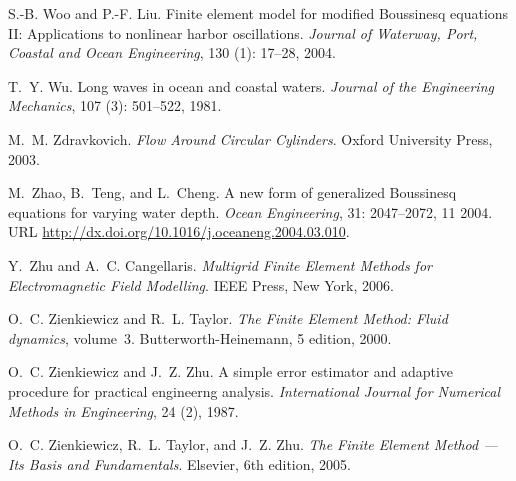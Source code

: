 \begin{thebibliography}{467}
S.-B. Woo and P.-F. Liu.
\newblock Finite element model for modified {B}oussinesq equations {II}:
  {A}pplications to nonlinear harbor oscillations.
\newblock \emph{Journal of Waterway, Port, Coastal and Ocean Engineering},
  130 (1): 17--28, 2004{}.

T.~Y. Wu.
\newblock Long waves in ocean and coastal waters.
\newblock \emph{Journal of the Engineering Mechanics}, 107
  (3): 501--522, 1981.

M.~M. Zdravkovich.
\newblock \emph{Flow Around Circular Cylinders}.
\newblock Oxford University Press, 2003.

M.~Zhao, B.~Teng, and L.~Cheng.
\newblock A new form of generalized {B}oussinesq equations for varying water
  depth.
\newblock \emph{Ocean Engineering}, 31: 2047--2072, 11 2004.
\newblock URL \url{http://dx.doi.org/10.1016/j.oceaneng.2004.03.010}.

Y.~Zhu and A.~C. Cangellaris.
\newblock \emph{Multigrid Finite Element Methods for Electromagnetic Field
  Modelling}.
\newblock IEEE Press, New York, 2006.

O.~C. Zienkiewicz and R.~L. Taylor.
\newblock \emph{The Finite Element Method: Fluid dynamics}, volume~3.
\newblock Butterworth-Heinemann, 5 edition, 2000.

O.~C. Zienkiewicz and J.~Z. Zhu.
\newblock A simple error estimator and adaptive procedure for practical
  engineerng analysis.
\newblock \emph{International Journal for Numerical Methods in Engineering},
  24 (2), 1987.

O.~C. Zienkiewicz, R.~L. Taylor, and J.~Z. Zhu.
\newblock \emph{The Finite Element Method --- Its Basis and Fundamentals}.
\newblock Elsevier, 6th edition, 2005.

\end{thebibliography}


\printindex

